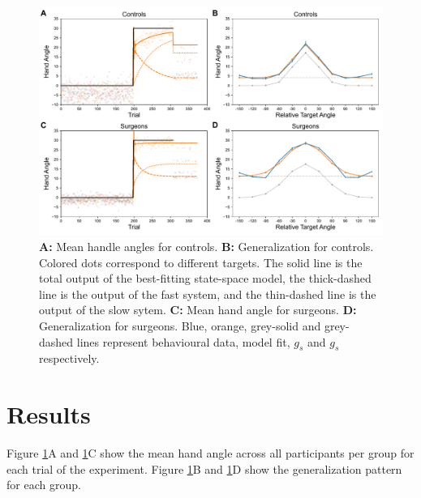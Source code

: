\documentclass[jou, 11pt, longtable, floatsintext, notab]{apa6}
\begin{document}
\begin{figure}[t]
  \centering
  \includegraphics[width=1.0\textwidth]{figures/fig_results.pdf}
  \caption{\scriptsize
   \textbf{A:} Mean handle angles for controls.
   \textbf{B:} Generalization for controls. Colored dots
   correspond to different targets. The solid line is the total
   output of the best-fitting state-space model, the
   thick-dashed line is the output of the fast system, and the
   thin-dashed line is the output of the slow sytem.
   \textbf{C:} Mean hand angle for surgeons.
   \textbf{D:} Generalization for surgeons. Blue, orange,
   grey-solid and grey-dashed lines represent behavioural data,
   model fit, $g_s$ and $g_s$ respectively.
   }
   \label{fig_results}
\end{figure}
\section{Results}
Figure \ref{fig_results}A and \ref{fig_results}C show the
mean hand angle across all participants per group for each
trial of the experiment. Figure \ref{fig_results}B and
\ref{fig_results}D show the generalization pattern for each
group.
\end{document}
